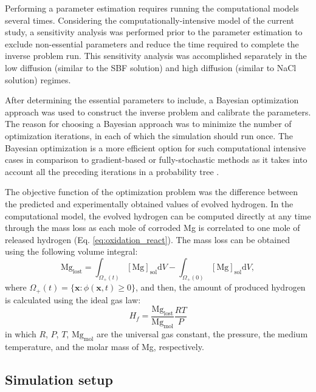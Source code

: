Performing a parameter estimation requires running the computational models several times. Considering the computationally-intensive model of the current study, a sensitivity analysis was performed prior to the parameter estimation to exclude non-essential parameters and reduce the time required to complete the inverse problem run. This sensitivity analysis was accomplished separately in the low diffusion (similar to the \gls{SBF} solution) and high diffusion (similar to NaCl solution) regimes.

After determining the essential parameters to include, a Bayesian optimization approach \cite{Mockus1989} was used to construct the inverse problem and calibrate the parameters. The reason for choosing a Bayesian approach was to minimize the number of optimization iterations, in each of which the simulation should run once. The Bayesian optimization is a more efficient option for such computational intensive cases in comparison to gradient-based or fully-stochastic methods as it takes into account all the preceding iterations in a probability tree \cite{Mehrian2017}.

The objective function of the optimization problem was the difference between the predicted and experimentally obtained values of evolved hydrogen. In the computational model, the evolved hydrogen can be computed directly at any time through the mass loss as each mole of corroded Mg is correlated to one mole of released hydrogen (Eq. \ref{eq:oxidation_react}). The mass loss can be obtained using the following volume integral:
\begin{equation} \label{eq:mass_loss}
\mathrm{Mg}_{\mathrm{lost}}=\int_{\Omega_{+}(t)} [\mathrm{Mg}]_{\mathrm{sol}} \mathrm{d} V-\int_{\Omega_{+}(0)} [\mathrm{Mg}]_{\mathrm{sol}} \mathrm{d} V,
\end{equation}
where $\Omega_{+}(t)=\{\mathbf{x}: \phi(\mathbf{x}, t) \geq 0\}$, and then, the amount of produced hydrogen is calculated using the ideal gas law:
\begin{equation} \label{eq:evolv_hydr}
H_{f}=\frac{\mathrm{Mg}_{\mathrm{lost}}}{\mathrm{Mg}_{\mathrm{mol}}} \frac{R T}{P}
\end{equation}
in which $R$, $P$, $T$, $\mathrm{Mg}_{\mathrm{mol}}$ are the universal gas constant, the pressure, the medium temperature, and  the molar mass of Mg, respectively.

\subsection{Simulation setup}

